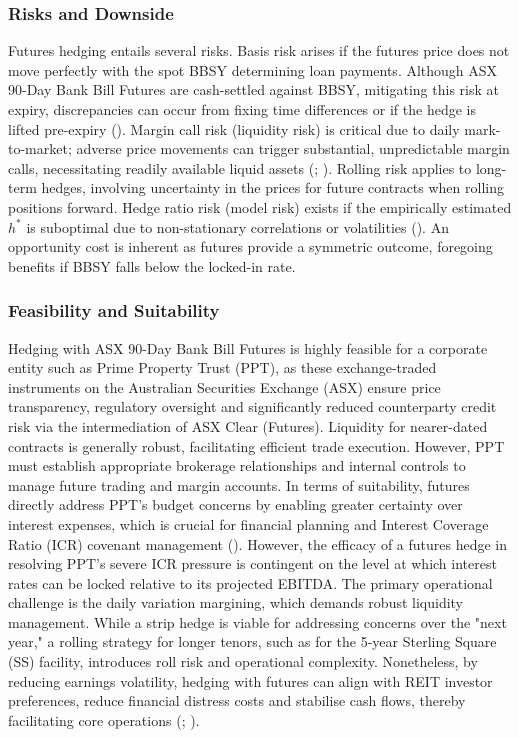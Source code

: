 \documentclass[11pt, a4paper, british]{article}
\begin{document}
\subsubsection{Risks and Downside}
Futures hedging entails several risks. Basis risk arises if the futures price does not move perfectly with the spot BBSY determining loan payments. Although ASX 90-Day Bank Bill Futures are cash-settled against BBSY, mitigating this risk at expiry, discrepancies can occur from fixing time differences or if the hedge is lifted pre-expiry (\cite{af}). Margin call risk (liquidity risk) is critical due to daily mark-to-market; adverse price movements can trigger substantial, unpredictable margin calls, necessitating readily available liquid assets (\cite{fk}; \cite{gp}). Rolling risk applies to long-term hedges, involving uncertainty in the prices for future contracts when rolling positions forward. Hedge ratio risk (model risk) exists if the empirically estimated $h^*$ is suboptimal due to non-stationary correlations or volatilities (\cite{lt}). An opportunity cost is inherent as futures provide a symmetric outcome, foregoing benefits if BBSY falls below the locked-in rate.

\subsubsection{Feasibility and Suitability}
Hedging with ASX 90-Day Bank Bill Futures is highly feasible for a corporate entity such as Prime Property Trust (PPT), as these exchange-traded instruments on the Australian Securities Exchange (ASX) ensure price transparency, regulatory oversight and significantly reduced counterparty credit risk via the intermediation of ASX Clear (Futures). Liquidity for nearer-dated contracts is generally robust, facilitating efficient trade execution. However, PPT must establish appropriate brokerage relationships and internal controls to manage future trading and margin accounts. In terms of suitability, futures directly address PPT's budget concerns by enabling greater certainty over interest expenses, which is crucial for financial planning and Interest Coverage Ratio (ICR) covenant management (\cite{ms}). However, the efficacy of a futures hedge in resolving PPT's severe ICR pressure is contingent on the level at which interest rates can be locked relative to its projected EBITDA. The primary operational challenge is the daily variation margining, which demands robust liquidity management. While a strip hedge is viable for addressing concerns over the "next year," a rolling strategy for longer tenors, such as for the 5-year Sterling Square (SS) facility, introduces roll risk and operational complexity. Nonetheless, by reducing earnings volatility, hedging with futures can align with REIT investor preferences, reduce financial distress costs and stabilise cash flows, thereby facilitating core operations (\cite{fss}; \cite{ss}).
\end{document}
